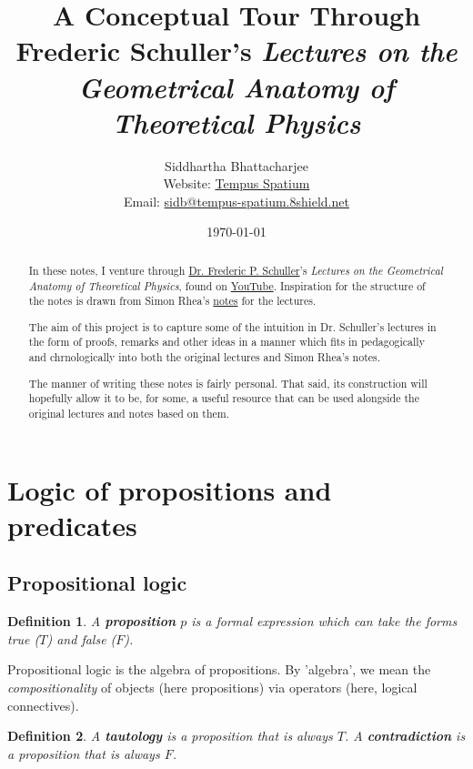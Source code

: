 \documentclass[12pt]{article}
\title{A Conceptual Tour Through Frederic Schuller's \emph{Lectures on the Geometrical Anatomy of Theoretical Physics}}
\author{Siddhartha Bhattacharjee \\
Website: \href{https://booodaness.github.io/tempus-spatium/}{Tempus Spatium} \\
Email: \href{javascript:location.href = 'mailto:' + ['sidb','tempus-spatium.8shield.net'].join('@')}{sidb@tempus-spatium.8shield.net}
}
\affil{Student, B.Sc. (Hons) Mathematical Physics, University of Waterloo}
\date{\today}
\newtheorem{definition}{Definition}[section]
\begin{document}
\maketitle

\begin{abstract}
In these notes, I venture through \href{https://people.utwente.nl/f.p.schuller}{Dr. Frederic P. Schuller}'s \emph{Lectures on the Geometrical Anatomy of Theoretical Physics}, found on \href{https://youtube.com/playlist?list=PLPH7f_7ZlzxTi6kS4vCmv4ZKm9u8g5yic}{YouTube}. Inspiration for the structure of the notes is drawn from Simon Rhea's \href{https://mathswithphysics.blogspot.com/2016/07/lectures-on-geometric-anatomy-of.html}{notes} for the lectures.

The aim of this project is to capture some of the intuition in Dr. Schuller's lectures in the form of proofs, remarks and other ideas in a manner which fits in pedagogically and chrnologically into both the original lectures and Simon Rhea's notes.

The manner of writing these notes is fairly personal. That said, its construction will hopefully allow it to be, for some, a useful resource that can be used alongside the original lectures and notes based on them.
\end{abstract}

\tableofcontents

\section{Logic of propositions and predicates}

\subsection{Propositional logic}

\begin{shaded}
\begin{definition}
A \textbf{proposition} $p$ is a formal expression which can take the forms \emph{true} ($T$) and \emph{false} ($F$).
\end{definition}
\end{shaded}

Propositional logic is the algebra of propositions. By 'algebra', we mean the \emph{compositionality} of objects (here propositions) via operators (here, logical connectives).

\begin{definition}
A \textbf{tautology} is a proposition that is always $T$. A \textbf{contradiction} is a proposition that is always $F$.
\end{definition}
\end{document}

